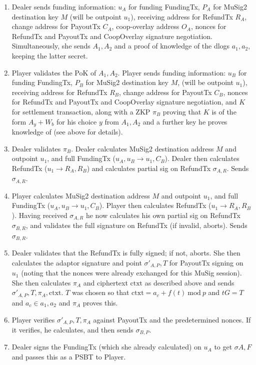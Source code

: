 \documentclass[11pt]{article}
\begin{document}
\begin{enumerate}
\item Dealer sends funding information: $u_A$ for funding FundingTx, $P_A$ for MuSig2 destination key $M$ (will be outpoint $u_1$), receiving address for RefundTx $R_A$, change address for PayoutTx $C_A$, coop-overlay address $O_A$, nonces for RefundTx and PayoutTx and CoopOverlay signature negotiation. Simultaneously, she sends $A_1, A_2$ and a proof of knowledge of the dlogs $a_1, a_2$, keeping the latter secret.
\item Player validates the PoK of $A_1, A_2$. Player sends funding information: $u_B$ for funding FundingTx, $P_B$ for MuSig2 destination key $M$, (will be outpoint $u_1$), receiving address for RefundTx $R_B$, change address for PayoutTx $C_B$, nonces for RefundTx and PayoutTx and CoopOverlay signature negotiation, and $K$ for settlement transaction, along with a ZKP $\pi_B$ proving that $K$ is of the form $A_y + W_b$ for his choice $y$ from $A_1, A_2$ and a further key he proves knowledge of (see above for details).
\item Dealer validates $\pi_B$. Dealer calculates MuSig2 destination address $M$ and outpoint $u_1$, and full FundingTx ($u_A, u_B \rightarrow u_1, C_B$). Dealer then calculates RefundTx ($u_1 \rightarrow R_A, R_B$) and calculates partial sig on RefundTx $\sigma_{A,R}$. Sends $\sigma_{A,R}$.
\item Player calculates MuSig2 destination address $M$ and outpoint $u_1$, and full FundingTx ($u_A, u_B \rightarrow u_1, C_B$). Player then calculates RefundTx ($u_1 \rightarrow R_A, R_B$). Having received $\sigma_{A,R}$ he now calculates his own partial sig on RefundTx $\sigma_{B,R}$, and validates the full signature on RefundTx (if invalid, aborts). Sends $\sigma_{B,R}$.
\item Dealer validates that the RefundTx is fully signed; if not, aborts. She then calculates the adaptor signature and point $\sigma'_{A, P}, T$ for PayoutTx signing on $u_1$ (noting that the nonces were already exchanged for this MuSig session).   She then calculates $\pi_A$ and ciphertext $\textrm{ctxt}$ as described above and sends $\sigma'_{A, P}, T, \pi_A, \textrm{ctxt}$. $T$ was chosen so that $\textrm{ctxt} = a_c + f(t)\ \textrm{mod}\ p$ and $tG = T$ and $a_c \in a_1,a_2$ and $\pi_A$ proves this.
\item Player verifies $\sigma'_{A, P}, T, \pi_A$ against PayoutTx and the predetermined nonces. If it verifies, he calculates, and then sends $\sigma_{B,P}$.
\item Dealer signs the FundingTx (which she already calculated) on $u_A$ to get $\sigma{A, F}$ and passes this as a PSBT to Player.

\end{enumerate}
\end{document}
